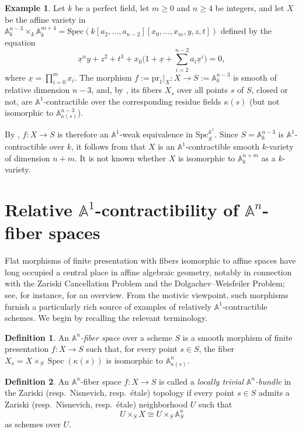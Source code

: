 \documentclass[10pt]{amsart}
\renewcommand{\AA}{\mathbb{A}}
\newcommand{\Spec}{\operatorname{Spec}}
\numberwithin{equation}{section} %
\theoremstyle{plain}
\theoremstyle{definition}
\newtheorem{defn}[defn]{Definition}
\newtheorem{example}[example]{Example}
\theoremstyle{remark}
\begin{document}
\begin{example} \label{thm:Higherdim-Families}
Let $k$ be a perfect field, let $m\geq 0$ and $n\geq 4$ be integers, and let $X$ be the affine variety in $\mathbb{A}^{n-3}_k\times_k \mathbb{A}^{m+4}_k=\mathrm{Spec}(k[a_2,\ldots, a_{n-2}][x_0,\ldots, x_{m},y,z,t])$ defined by the equation 
\[
\underline{x}^ny+z^2+t^3+x_0\bigl(1+\underline{x} +\sum_{i=2}^{n-2} a_i \underline{x}^i\bigr)=0,
\]
where $\underline{x}=\prod_{i=0}^m x_i$. The morphism $f:=\mathrm{pr}_1|_X:X\to S:=\mathbb{A}^{n-3}_k$ is smooth of relative dimension $n-3$, and, by \cite{dubouloz2025,Krishna25}, its fibers $X_s$ over all points $s$ of $S$, closed or not, are $\AA^1$-contractible over the corresponding residue fields $\kappa(s)$ (but not isomorphic to $\AA^{n-3}_{\kappa(s)}$). 

By , $f:X\to S$ is therefore an $\AA^1$-weak equivalence in $\mathrm{Spc}_S^{\AA^1}$. Since $S=\AA^{n-3}_k$ is $\AA^1$-contractible over $k$, it follows from  that $X$ is an $\AA^1$-contractible smooth $k$-variety of dimension $n+m$. It is not known whether $X$ is isomorphic to $\AA^{n+m}_k$ as a $k$-variety. 
\end{example}


\section{Relative \texorpdfstring{$\AA^1$}{A1}-contractibility of \texorpdfstring{$\AA^n$}{An}-fiber spaces} \label{Asanuma:stabletheorem}

Flat morphisms of finite presentation with fibers isomorphic to affine spaces have long occupied a central place in affine algebraic geometry, notably in connection with the Zariski Cancellation Problem and the Dolgachev--Weisfeiler Problem; see, for instance, \cite{Kr96} for an overview. From the motivic viewpoint, such morphisms furnish a particularly rich source of examples of relatively $\AA^1$-contractible schemes. We begin by recalling the relevant terminology.

\begin{defn}\label{def:A1-fib-space}
An \emph{$\AA^n$-fiber space} over a scheme $S$ is a smooth morphism of finite presentation $f:X\to S$ such that, for every point $s\in S$, the fiber $X_s=X\times_S \Spec(\kappa(s))$ is isomorphic to $\AA^n_{\kappa(s)}$.
\end{defn}

\begin{defn}
An $\AA^n$-fiber space $f:X\to S$ is called a \emph{locally trivial $\AA^n$-bundle} in the Zariski (resp.\ Nisnevich, resp.\ \'etale) topology if every point $s\in S$ admits a Zariski (resp.\ Nisnevich, resp.\ \'etale) neighborhood $U$ such that
\[
U\times_S X \cong U\times_S \AA^n_S
\]
as schemes over $U$.
\end{defn}
\end{document}
